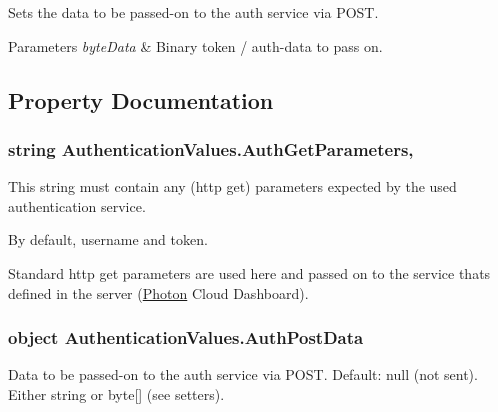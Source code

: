 Sets the data to be passed-\/on to the auth service via P\+O\+ST. 


\begin{DoxyParams}{Parameters}
{\em byte\+Data} & Binary token / auth-\/data to pass on.\\
\hline
\end{DoxyParams}


\subsection{Property Documentation}
\subsubsection[{\texorpdfstring{Auth\+Get\+Parameters}{AuthGetParameters}}]{\setlength{\rightskip}{0pt plus 5cm}string Authentication\+Values.\+Auth\+Get\+Parameters\hspace{0.3cm}{\ttfamily [get]}, {\ttfamily [set]}}\hypertarget{class_authentication_values_a960384fb735ced0be6ee2d3e365fd5aa}{}\label{class_authentication_values_a960384fb735ced0be6ee2d3e365fd5aa}


This string must contain any (http get) parameters expected by the used authentication service. 

By default, username and token.

Standard http get parameters are used here and passed on to the service that\textquotesingle{}s defined in the server (\hyperlink{namespace_photon}{Photon} Cloud Dashboard).
\subsubsection[{\texorpdfstring{Auth\+Post\+Data}{AuthPostData}}]{\setlength{\rightskip}{0pt plus 5cm}object Authentication\+Values.\+Auth\+Post\+Data\hspace{0.3cm}{\ttfamily [get]}}\hypertarget{class_authentication_values_ae5df4bb87c20c0e83e1f13ca126a3b5f}{}\label{class_authentication_values_ae5df4bb87c20c0e83e1f13ca126a3b5f}


Data to be passed-\/on to the auth service via P\+O\+ST. Default\+: null (not sent). Either string or byte\mbox{[}\mbox{]} (see setters).

